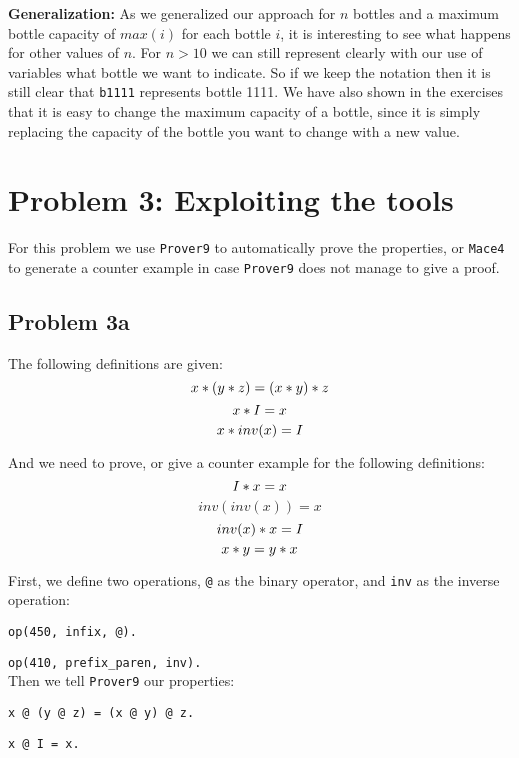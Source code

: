 \documentclass[a4paper]{article}
\begin{document}
{	{\bf Generalization:} 
As we generalized our approach for $n$ bottles and a maximum bottle capacity of $max(i)$ for each bottle $i$, it is interesting to see what happens for other values of $n$. For $n > 10$ we can still represent clearly with our use of variables what bottle we want to indicate. So if we keep the notation then it is still clear that \texttt{b1111} represents bottle 1111. We have also shown in the exercises that it is easy to change the maximum capacity of a bottle, since it is simply replacing the capacity of the bottle you want to change with a new value.
	
	
	\section*{Problem 3: Exploiting the tools}
	For this problem we use {\tt Prover9} to automatically prove the properties, or {\tt Mace4} to generate a counter example in case {\tt Prover9} does not manage to give a proof.
	
	\subsection*{Problem 3a}
	The following definitions are given:
	$$ x \** (y \** z) = (x \** y) \** z$$
	$$x \** I = x$$
	$$x \** inv(x) = I$$
	
	And we need to prove, or give a counter example for the following definitions:
	$$I \** x = x$$
	$$inv(inv(x)) = x$$
	$$inv(x) \** x = I$$ 
	$$x \** y = y \** x$$
	
	First, we define two operations, {\tt @} as the binary operator, and {\tt inv} as the inverse operation:
	
	{\tt op(450, infix, @). }
	
	{\tt op(410, prefix\_paren, inv).}\\
	
	Then we tell {\tt Prover9} our properties: 
	
	{\tt x @ (y @ z) = (x @ y) @ z.}
	
	{\tt x @ I = x.}
	 
}
\end{document}
